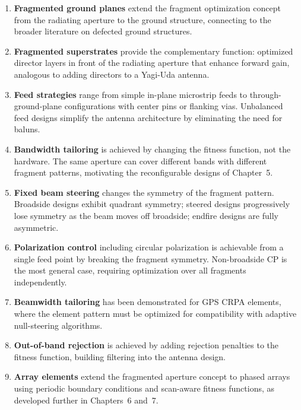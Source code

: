\begin{enumerate}

\item \textbf{Fragmented ground planes} extend the fragment optimization concept from the radiating aperture to the ground structure, connecting to the broader literature on defected ground structures.

\item \textbf{Fragmented superstrates} provide the complementary function: optimized director layers in front of the radiating aperture that enhance forward gain, analogous to adding directors to a Yagi-Uda antenna.

\item \textbf{Feed strategies} range from simple in-plane microstrip feeds to through-ground-plane configurations with center pins or flanking vias.  Unbalanced feed designs simplify the antenna architecture by eliminating the need for baluns.

\item \textbf{Bandwidth tailoring} is achieved by changing the fitness function, not the hardware.  The same aperture can cover different bands with different fragment patterns, motivating the reconfigurable designs of Chapter~5.

\item \textbf{Fixed beam steering} changes the symmetry of the fragment pattern.  Broadside designs exhibit quadrant symmetry; steered designs progressively lose symmetry as the beam moves off broadside; endfire designs are fully asymmetric.

\item \textbf{Polarization control} including circular polarization is achievable from a single feed point by breaking the fragment symmetry.  Non-broadside CP is the most general case, requiring optimization over all fragments independently.

\item \textbf{Beamwidth tailoring} has been demonstrated for GPS CRPA elements, where the element pattern must be optimized for compatibility with adaptive null-steering algorithms.

\item \textbf{Out-of-band rejection} is achieved by adding rejection penalties to the fitness function, building filtering into the antenna design.

\item \textbf{Array elements} extend the fragmented aperture concept to phased arrays using periodic boundary conditions and scan-aware fitness functions, as developed further in Chapters~6 and~7.

\end{enumerate}

